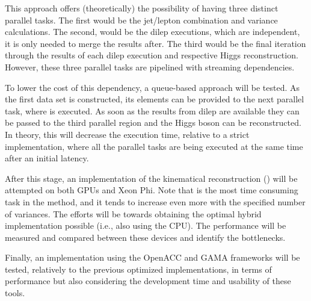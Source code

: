 This approach offers (theoretically) the possibility of having three distinct parallel tasks. The first would be the jet/lepton combination and variance calculations. The second, would be the dilep executions, which are independent, it is only needed to merge the results after. The third would be the final iteration through the results of each dilep execution and respective Higgs reconstruction. However, these three parallel tasks are pipelined with streaming dependencies. 

To lower the cost of this dependency, a queue-based approach will be tested. As the first data set is constructed, its elements can be provided to the next parallel task, where \dilep is executed. As soon as the results from dilep are available they can be passed to the third parallel region and the Higgs boson can be reconstructed. In theory, this will decrease the execution time, relative to a strict implementation, where all the parallel tasks are being executed at the same time after an initial latency.

After this stage, an implementation of the kinematical reconstruction (\dilep) will be attempted on both GPUs and Xeon Phi. Note that \dilep is the most time consuming task in the \ttLoop method, and it tends to increase even more with the specified number of variances. The efforts will be towards obtaining the optimal hybrid implementation possible (i.e., also using the CPU). The performance will be measured and compared between these devices and identify the bottlenecks.

Finally, an implementation using the OpenACC and GAMA frameworks will be tested, relatively to the previous optimized implementations, in terms of performance but also considering the development time and usability of these tools.

\newpage
